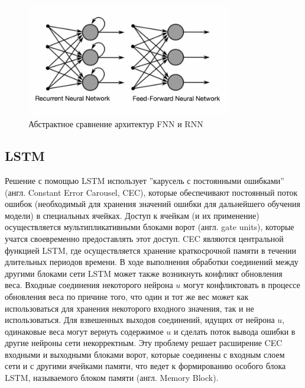 \documentclass[bachelor, och, referat]{../shiza}
\begin{document}
            \begin{figure}[H]
                \centering
                \includegraphics[width=0.8\textwidth]{pic/rnn-vs-fnn.png}
                \caption{Абстрактное сравнение архитектур FNN и RNN}
            \end{figure}

        \subsection{LSTM}

            Решение с помощью LSTM использует ''карусель с постоянными
            ошибками'' (англ. Constant Error Carousel, CEC), которые
            обеспечивают постоянный поток ошибок (необходимый для хранения
            значений ошибки для дальнейшего обучения модели) в специальных
            ячейках. Доступ к ячейкам (и их применение) осуществляется
            мультипликативными блоками ворот (англ. gate units), которые учатся
            своевременно предоставлять этот доступ. CEC являются центральной
            функцией LSTM, где осуществляется хранение краткосрочной памяти в
            течении длительных периодов времени. В ходе выполнения обработки
            соединений между другими блоками сети LSTM может также возникнуть
            конфликт обновления веса. Входные соединения некоторого нейрона $u$
            могут конфликтовать в процессе обновления веса по причине того, что
            один и тот же вес может как использоваться для хранения некоторого
            входного значения, так и не использоваться. Для взвешенных выходов
            соединений, идущих от нейрона $u$, одинаковые веса могут вернуть
            содержимое $u$ и сделать поток вывода ошибки в другие нейроны сети
            некорректным. Эту проблему решает расширение CEC входными и
            выходными блоками ворот, которые соединены с входным слоем сети и с
            другими ячейками памяти, что ведет к формированию особого блока
            LSTM, называемого блоком памяти (англ. Memory Block).
\end{document}
